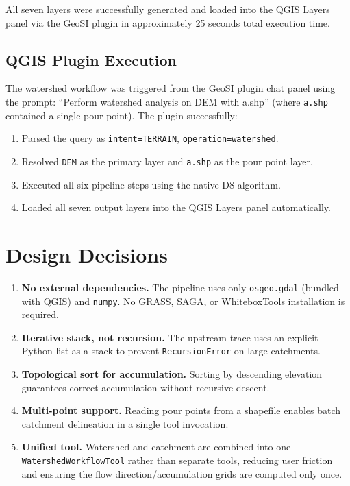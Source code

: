 All seven layers were successfully generated and loaded into the QGIS Layers
panel via the GeoSI plugin in approximately 25 seconds total execution time.

\subsection{QGIS Plugin Execution}

The watershed workflow was triggered from the GeoSI plugin chat panel using the
prompt: ``Perform watershed analysis on DEM with a.shp'' (where \texttt{a.shp}
contained a single pour point).  The plugin successfully:

\begin{enumerate}
  \item Parsed the query as \texttt{intent=TERRAIN}, \texttt{operation=watershed}.
  \item Resolved \texttt{DEM} as the primary layer and \texttt{a.shp} as the pour
        point layer.
  \item Executed all six pipeline steps using the native D8 algorithm.
  \item Loaded all seven output layers into the QGIS Layers panel automatically.
\end{enumerate}

\section{Design Decisions}

\begin{enumerate}
  \item \textbf{No external dependencies.}  The pipeline uses only
        \texttt{osgeo.gdal} (bundled with QGIS) and \texttt{numpy}.  No GRASS,
        SAGA, or WhiteboxTools installation is required.
  \item \textbf{Iterative stack, not recursion.}  The upstream trace uses an
        explicit Python list as a stack to prevent \texttt{RecursionError} on
        large catchments.
  \item \textbf{Topological sort for accumulation.}  Sorting by descending
        elevation guarantees correct accumulation without recursive descent.
  \item \textbf{Multi-point support.}  Reading pour points from a shapefile
        enables batch catchment delineation in a single tool invocation.
  \item \textbf{Unified tool.}  Watershed and catchment are combined into one
        \texttt{WatershedWorkflowTool} rather than separate tools, reducing
        user friction and ensuring the flow direction/accumulation grids are
        computed only once.
\end{enumerate}


